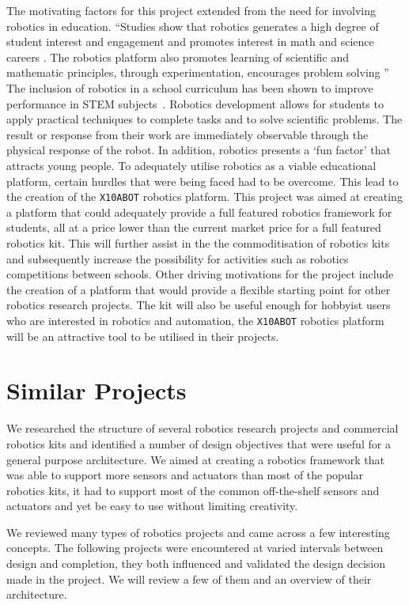 The motivating factors for this project extended from the need for involving
robotics in education. ``Studies show that robotics generates a high
degree of student interest and engagement and promotes interest in math and 
science careers .  The robotics platform also promotes learning of scientific 
and mathematic principles, through experimentation, encourages problem
solving ''~\parencite{barker}
The  inclusion of robotics in a school curriculum has been
shown to improve performance in STEM subjects~\parencite{school}. 
Robotics development allows for students to apply practical techniques to complete tasks and 
to solve scientific problems. The result or response from their work are
immediately observable through the physical response of the robot. In addition,
robotics  presents a `fun factor' that attracts young people.
To adequately utilise robotics as a viable educational platform, certain hurdles 
that were being faced had to be overcome. This lead to the creation of the \texttt{X10ABOT} robotics
platform. This project was aimed at creating a platform that could 
adequately provide a full featured robotics framework for students, all at a
price lower than the current market price for a full featured robotics kit.
This will further assist in the the commoditisation of robotics kits and subsequently
increase the possibility for activities such as robotics competitions between schools.
Other driving motivations for the project include the creation of a platform that
would provide a flexible starting point for other robotics research projects. The kit
will also be useful enough for hobbyist users who are interested in robotics
and automation, the \texttt{X10ABOT} robotics platform will be an attractive tool to be utilised in their projects.

\section{Similar Projects} %
\label{sec:similar}
We researched the structure of several robotics research projects and commercial robotics kits and identified a number of design objectives that were useful for a general purpose architecture. We aimed at creating a robotics framework that was able to support more sensors and actuators than most of the popular robotics kits, it had to support most of the common off-the-shelf sensors and actuators and yet be easy to use without limiting creativity. 

We reviewed many types of robotics projects and came across a few interesting concepts. The following projects were encountered at varied intervals between design and completion, they both influenced and validated the design decision made in the \xten project. We will review a few of them and an overview of their architecture. 

